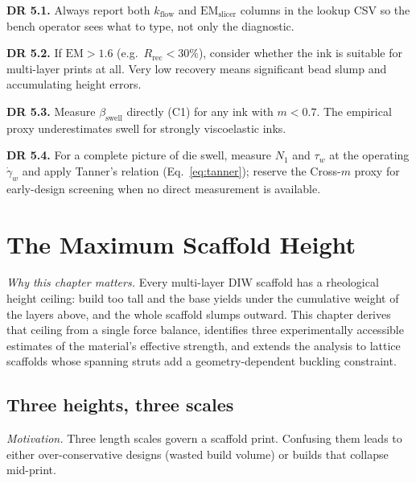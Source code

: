 \documentclass[11pt,a4paper]{article}
\newcommand{\gd}{\dot{\gamma}}
\begin{document}
\begin{designrulebox}
\textbf{DR 5.1.} Always report both $k_\mathrm{flow}$ and
$\mathrm{EM}_\mathrm{slicer}$ columns in the lookup CSV so the
bench operator sees what to type, not only the diagnostic.

\textbf{DR 5.2.} If $\mathrm{EM}>1.6$ (e.g.\ $R_\mathrm{rec}<30\%$),
consider whether the ink is suitable for multi-layer prints at all.
Very low recovery means significant bead slump and accumulating height
errors.

\textbf{DR 5.3.} Measure $\beta_\mathrm{swell}$ directly (C1) for
any ink with $m<0.7$. The empirical proxy underestimates swell for
strongly viscoelastic inks.

\textbf{DR 5.4.} For a complete picture of die swell, measure $N_1$
and $\tau_w$ at the operating $\gd_w$ and apply Tanner's relation
(Eq.~\ref{eq:tanner}); reserve the Cross-$m$ proxy for early-design
screening when no direct measurement is available.
\end{designrulebox}

\section{The Maximum Scaffold Height}
\label{sec:hmax}

\emph{Why this chapter matters.}
Every multi-layer DIW scaffold has a rheological height ceiling: build too
tall and the base yields under the cumulative weight of the layers above,
and the whole scaffold slumps outward.  This chapter derives that ceiling
from a single force balance, identifies three experimentally accessible
estimates of the material's effective strength, and extends the analysis
to lattice scaffolds whose spanning struts add a geometry-dependent
buckling constraint.

\subsection{Three heights, three scales}

\emph{Motivation.}
Three length scales govern a scaffold print.  Confusing them leads to
either over-conservative designs (wasted build volume) or builds that
collapse mid-print.
\end{document}
